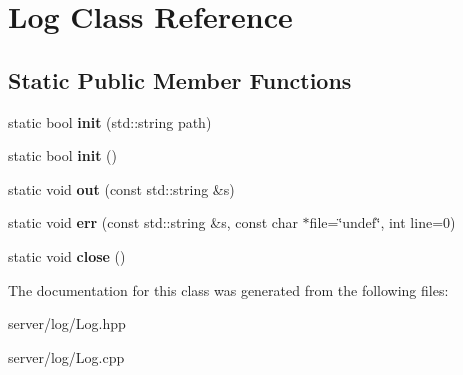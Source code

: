 \hypertarget{class_log}{\section{Log Class Reference}
\label{class_log}
}
\subsection*{Static Public Member Functions}
\begin{DoxyCompactItemize}
\item 
\hypertarget{class_log_ad2ad305c7a5568d4ff89df63b7df023b}{static bool {\bfseries init} (std\-::string path)}\label{class_log_ad2ad305c7a5568d4ff89df63b7df023b}

\item 
\hypertarget{class_log_add642ef2c66a1773737afedb7531fbc3}{static bool {\bfseries init} ()}\label{class_log_add642ef2c66a1773737afedb7531fbc3}

\item 
\hypertarget{class_log_a81fa7aade11d8cd8bf1e8d9bac33f92a}{static void {\bfseries out} (const std\-::string \&s)}\label{class_log_a81fa7aade11d8cd8bf1e8d9bac33f92a}

\item 
\hypertarget{class_log_a30b6e5da5382d09ad9c8e906893cfafa}{static void {\bfseries err} (const std\-::string \&s, const char $\ast$file=\char`\"{}undef\char`\"{}, int line=0)}\label{class_log_a30b6e5da5382d09ad9c8e906893cfafa}

\item 
\hypertarget{class_log_adcbc96155698ce75c3ff098cb7699c09}{static void {\bfseries close} ()}\label{class_log_adcbc96155698ce75c3ff098cb7699c09}

\end{DoxyCompactItemize}


The documentation for this class was generated from the following files\-:\begin{DoxyCompactItemize}
\item 
server/log/Log.\-hpp\item 
server/log/Log.\-cpp\end{DoxyCompactItemize}
